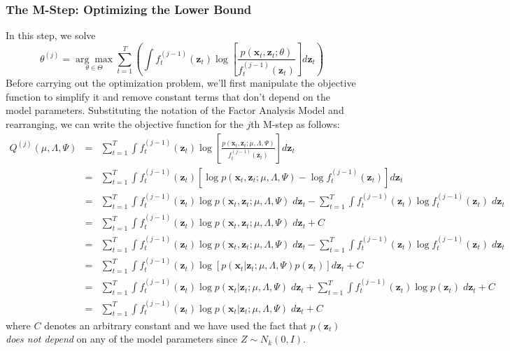 \documentclass[12pt]{article}
\theoremstyle{definition}
\begin{document}
\subsubsection{The M-Step: Optimizing the Lower Bound}
In this step, we solve 
	$$\displaystyle\theta^{(j)} = \underset{\theta \in \Theta}{\arg \max} \sum_{t = 1}^T  \left(\int f_t^{(j-1)}(\mathbf{z}_t) \log\left[\frac{p(\textbf{x}_t,\textbf{z}_t;\theta)}{f_t^{(j-1)}(\mathbf{z}_t)}\right] d \textbf{z}_t \right)$$
Before carrying out the optimization problem, we'll first manipulate the objective function to simplify it and remove constant terms that don't depend on the model parameters. Substituting the notation of the Factor Analysis Model and rearranging, we can write the objective function for the $j$th M-step as follows:
	\begin{eqnarray*}
		Q^{(j)}(\mu, \Lambda, \Psi) &=& \sum_{t=1}^T \int f_t^{(j-1)}(\textbf{z}_t) \log \left[ \frac{p(\textbf{x}_t, \textbf{z}_t;\mu, \Lambda, \Psi)}{f_t^{(j-1)}(\textbf{z}_t)}\right] d \textbf{z}_t\\
			&=&	\sum_{t=1}^T \int f_t^{(j-1)}(\textbf{z}_t) \left[\log p(\textbf{x}_t, \textbf{z}_t;\mu, \Lambda, \Psi) - \log f_t^{(j-1)}(\textbf{z}_t)\right] d \textbf{z}_t\\
		&=&\sum_{t=1}^T \int f_t^{(j-1)}(\textbf{z}_t) \log p(\textbf{x}_t, \textbf{z}_t;\mu, \Lambda, \Psi)\;d \textbf{z}_t -\sum_{t=1}^T  \int f_t^{(j-1)}(\textbf{z}_t) \log f_t^{(j-1)}(\textbf{z}_t) \;d \textbf{z}_t\\
		&=&\sum_{t=1}^T \int f_t^{(j-1)}(\textbf{z}_t) \log p(\textbf{x}_t, \textbf{z}_t;\mu, \Lambda, \Psi)\;d \textbf{z}_t  + C\\
		&=& \sum_{t=1}^T \int f_t^{(j-1)}(\textbf{z}_t) \log p(\textbf{x}_t, \textbf{z}_t;\mu, \Lambda, \Psi)\;d \textbf{z}_t -\sum_{t=1}^T  \int f_t^{(j-1)}(\textbf{z}_t) \log f_t^{(j-1)}(\textbf{z}_t) \;d \textbf{z}_t\\
		&=&\sum_{t=1}^T \int f_t^{(j-1)}(\textbf{z}_t) \log\left[ p(\textbf{x}_t| \textbf{z}_t;\mu, \Lambda, \Psi)p(\textbf{z}_t) \right]d \textbf{z}_t  + C\\
		&=&\sum_{t=1}^T \int f_t^{(j-1)}(\textbf{z}_t) \log p(\textbf{x}_t| \textbf{z}_t;\mu, \Lambda, \Psi)\;d \textbf{z}_t + \sum_{t=1}^T \int f_t^{(j-1)}(\textbf{z}_t)\log p(\textbf{z}_t)\; d \mathbf{z}_t + C\\
		&=& \sum_{t=1}^T \int f_t^{(j-1)}(\textbf{z}_t) \log p(\textbf{x}_t| \textbf{z}_t;\mu, \Lambda, \Psi)\;d \textbf{z}_t + C
	\end{eqnarray*} 
where $C$ denotes an arbitrary constant and we have used the fact that $p(\mathbf{z}_t)$ \emph{does not depend} on any of the model parameters since $Z \sim N_k(0, I)$. 
\end{document}
